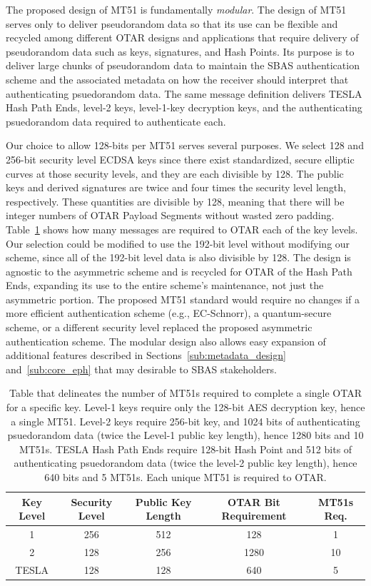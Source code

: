 \documentclass[APA,STIX1COL]{IONjournal/ION-APA Template}
\begin{document}
	The proposed design of MT51 is fundamentally {\em modular}.
	The design of MT51 serves only to deliver pseudorandom data so that its use can be flexible and recycled among different OTAR designs and applications that require delivery of pseudorandom data such as keys, signatures, and Hash Points. 
	Its purpose is to deliver large chunks of pseudorandom data to maintain the SBAS authentication scheme and the associated metadata on how the receiver should interpret that authenticating psuedorandom data.
	The same message definition delivers TESLA Hash Path Ends, level-2 keys, level-1-key decryption keys, and the authenticating psuedorandom data required to authenticate each.

	Our choice to allow 128-bits per MT51 serves several purposes.
	We select 128 and 256-bit security level ECDSA keys since there exist standardized, secure elliptic curves at those security levels, and they are each divisible by 128.
	The public keys and derived signatures are twice and four times the security level length, respectively.
	These quantities are divisible by 128, meaning that there will be integer numbers of OTAR Payload Segments without wasted zero padding.
	Table~\ref{tab: psuedorandom lengths} shows how many messages are required to OTAR each of the key levels.
	Our selection could be modified to use the 192-bit level without modifying our scheme, since all of the 192-bit level data is also divisible by 128.
	The design is agnostic to the asymmetric scheme and is recycled for OTAR of the Hash Path Ends, expanding its use to the entire scheme's maintenance, not just the asymmetric portion.
	The proposed MT51 standard would require no changes if a more efficient authentication scheme (e.g., EC-Schnorr), a quantum-secure scheme, or a different security level replaced the proposed asymmetric authentication scheme.
	The modular design also allows easy expansion of additional features described in Sections~\ref{sub:metadata_design} and~\ref{sub:core_eph} that may desirable to SBAS stakeholders.
		\begin{table}[H]
		\center
		\begin{tabular}{|c|c|c|c|c|} \hline
			Key Level & Security Level & Public Key Length & OTAR Bit Requirement & MT51s Req. \\ \hline
			    1 & 256 & 512 &  128 & 1 \\ \hline
			    2 & 128 & 256 & 1280 & 10\\ \hline
			TESLA & 128 & 128 &  640 & 5 \\ \hline
		\end{tabular}
		\caption{Table that delineates the number of MT51s required to complete a single OTAR for a specific key. Level-1 keys require only the 128-bit AES decryption key, hence a single MT51. Level-2 keys require 256-bit key, and 1024 bits of authenticating psuedorandom data (twice the Level-1 public key length), hence 1280 bits and 10 MT51s. TESLA Hash Path Ends require 128-bit Hash Point and 512 bits of authenticating psuedorandom data (twice the level-2 public key length), hence 640 bits and 5 MT51s. Each unique MT51 is required to OTAR.}
		\label{tab: psuedorandom lengths}
	\end{table}
\end{document}
